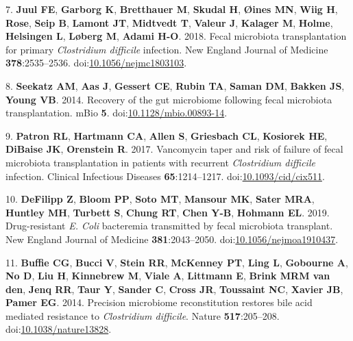 \documentclass[11pt,]{article}
\newlength{\cslhangindent}
\newenvironment{cslreferences}%
  {\setlength{\parindent}{0pt}%
  \everypar{\setlength{\hangindent}{\cslhangindent}}\ignorespaces}%
  {\par}
\begin{document}
\begin{cslreferences}
\leavevmode\hypertarget{ref-juul2018}{}%
7. \textbf{Juul FE}, \textbf{Garborg K}, \textbf{Bretthauer M},
\textbf{Skudal H}, \textbf{Øines MN}, \textbf{Wiig H}, \textbf{Rose},
\textbf{Seip B}, \textbf{Lamont JT}, \textbf{Midtvedt T}, \textbf{Valeur
J}, \textbf{Kalager M}, \textbf{Holme}, \textbf{Helsingen L},
\textbf{Løberg M}, \textbf{Adami H-O}. 2018. Fecal microbiota
transplantation for primary \emph{Clostridium difficile} infection. New
England Journal of Medicine \textbf{378}:2535--2536.
doi:\href{https://doi.org/10.1056/nejmc1803103}{10.1056/nejmc1803103}.

\leavevmode\hypertarget{ref-seekatz2014}{}%
8. \textbf{Seekatz AM}, \textbf{Aas J}, \textbf{Gessert CE},
\textbf{Rubin TA}, \textbf{Saman DM}, \textbf{Bakken JS}, \textbf{Young
VB}. 2014. Recovery of the gut microbiome following fecal microbiota
transplantation. mBio \textbf{5}.
doi:\href{https://doi.org/10.1128/mbio.00893-14}{10.1128/mbio.00893-14}.

\leavevmode\hypertarget{ref-patron2017}{}%
9. \textbf{Patron RL}, \textbf{Hartmann CA}, \textbf{Allen S},
\textbf{Griesbach CL}, \textbf{Kosiorek HE}, \textbf{DiBaise JK},
\textbf{Orenstein R}. 2017. Vancomycin taper and risk of failure of
fecal microbiota transplantation in patients with recurrent
\emph{Clostridium difficile} infection. Clinical Infectious Diseases
\textbf{65}:1214--1217.
doi:\href{https://doi.org/10.1093/cid/cix511}{10.1093/cid/cix511}.

\leavevmode\hypertarget{ref-defilipp2019}{}%
10. \textbf{DeFilipp Z}, \textbf{Bloom PP}, \textbf{Soto MT},
\textbf{Mansour MK}, \textbf{Sater MRA}, \textbf{Huntley MH},
\textbf{Turbett S}, \textbf{Chung RT}, \textbf{Chen Y-B},
\textbf{Hohmann EL}. 2019. Drug-resistant \emph{E. Coli} bacteremia
transmitted by fecal microbiota transplant. New England Journal of
Medicine \textbf{381}:2043--2050.
doi:\href{https://doi.org/10.1056/nejmoa1910437}{10.1056/nejmoa1910437}.

\leavevmode\hypertarget{ref-buffie2015}{}%
11. \textbf{Buffie CG}, \textbf{Bucci V}, \textbf{Stein RR},
\textbf{McKenney PT}, \textbf{Ling L}, \textbf{Gobourne A}, \textbf{No
D}, \textbf{Liu H}, \textbf{Kinnebrew M}, \textbf{Viale A},
\textbf{Littmann E}, \textbf{Brink MRM van den}, \textbf{Jenq RR},
\textbf{Taur Y}, \textbf{Sander C}, \textbf{Cross JR}, \textbf{Toussaint
NC}, \textbf{Xavier JB}, \textbf{Pamer EG}. 2014. Precision microbiome
reconstitution restores bile acid mediated resistance to
\emph{Clostridium difficile}. Nature \textbf{517}:205--208.
doi:\href{https://doi.org/10.1038/nature13828}{10.1038/nature13828}.


\end{cslreferences}
\end{document}
